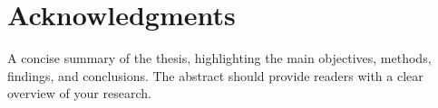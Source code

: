 \section*{\Huge Acknowledgments}
A concise summary of the thesis, highlighting the main objectives, methods, findings, and conclusions. The abstract should provide readers with a clear overview of your research.


